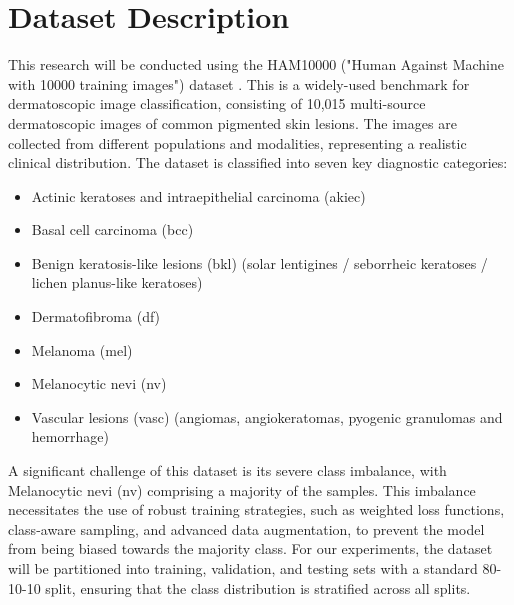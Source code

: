 \clearpage


\section{Dataset Description}

\noindent This research will be conducted using the HAM10000 ("Human Against Machine with 10000 training images") dataset \cite{tschandl2018ham10000}. This is a widely-used benchmark for dermatoscopic image classification, consisting of 10,015 multi-source dermatoscopic images of common pigmented skin lesions. The images are collected from different populations and modalities, representing a realistic clinical distribution. The dataset is classified into seven key diagnostic categories:

\begin{itemize}
    \item Actinic keratoses and intraepithelial carcinoma (akiec)

    \item Basal cell carcinoma (bcc)

    \item Benign keratosis-like lesions (bkl) (solar lentigines / seborrheic keratoses / lichen planus-like keratoses)

    \item Dermatofibroma (df)
 
    \item Melanoma (mel)

    \item Melanocytic nevi (nv)

    \item Vascular lesions (vasc) (angiomas, angiokeratomas, pyogenic granulomas and hemorrhage)
\end{itemize}

A significant challenge of this dataset is its severe class imbalance, with Melanocytic nevi (nv) comprising a majority of the samples. This imbalance necessitates the use of robust training strategies, such as weighted loss functions, class-aware sampling, and advanced data augmentation, to prevent the model from being biased towards the majority class. For our experiments, the dataset will be partitioned into training, validation, and testing sets with a standard 80-10-10 split, ensuring that the class distribution is stratified across all splits.
